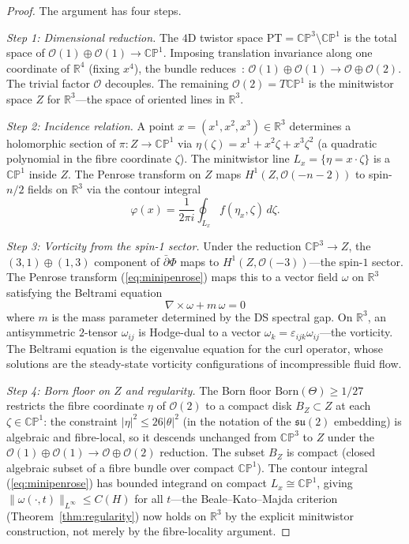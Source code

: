 \documentclass[11pt,a4paper]{article}
\theoremstyle{definition}
\theoremstyle{remark}
\newcommand{\CP}{\mathbb{CP}}
\newcommand{\R}{\mathbb{R}}
\newcommand{\dbar}{\bar{\partial}}
\newcommand{\su}{\mathfrak{su}}
\newcommand{\PT}{\mathrm{PT}}
\begin{document}
\begin{proof}
The argument has four steps.

\emph{Step 1: Dimensional reduction.} The $4$D twistor space $\PT=\CP^3\setminus\CP^1$ is the total space of $\mathcal{O}(1)\oplus\mathcal{O}(1)\to\CP^1$. Imposing translation invariance along one coordinate of $\R^4$ (fixing $x^4$), the bundle reduces~\cite{Hitchin1982}: $\mathcal{O}(1)\oplus\mathcal{O}(1)\to\mathcal{O}\oplus\mathcal{O}(2)$. The trivial factor $\mathcal{O}$ decouples. The remaining $\mathcal{O}(2)=T\CP^1$ is the minitwistor space $Z$ for $\R^3$---the space of oriented lines in $\R^3$.

\emph{Step 2: Incidence relation.} A point $x=(x^1,x^2,x^3)\in\R^3$ determines a holomorphic section of $\pi:Z\to\CP^1$ via $\eta(\zeta)=x^1+x^2\zeta+x^3\zeta^2$ (a quadratic polynomial in the fibre coordinate $\zeta$). The minitwistor line $L_x=\{\eta=x\cdot\zeta\}$ is a $\CP^1$ inside $Z$. The Penrose transform on $Z$ maps $H^1(Z,\mathcal{O}(-n-2))$ to spin-$n/2$ fields on $\R^3$ via the contour integral
\begin{equation}\label{eq:minipenrose}
\varphi(x)=\frac{1}{2\pi i}\oint_{L_x}f(\eta_x,\zeta)\,d\zeta.
\end{equation}

\emph{Step 3: Vorticity from the spin-1 sector.} Under the reduction $\CP^3\to Z$, the $(3,1)\oplus(1,3)$ component of $\dbar\Phi$ maps to $H^1(Z,\mathcal{O}(-3))$---the spin-$1$ sector. The Penrose transform (\ref{eq:minipenrose}) maps this to a vector field $\omega$ on $\R^3$ satisfying the Beltrami equation
\begin{equation}\label{eq:beltrami}
\nabla\times\omega+m\,\omega=0
\end{equation}
where $m$ is the mass parameter determined by the DS spectral gap. On $\R^3$, an antisymmetric $2$-tensor $\omega_{ij}$ is Hodge-dual to a vector $\omega_k=\varepsilon_{ijk}\omega_{ij}$---the vorticity. The Beltrami equation is the eigenvalue equation for the curl operator, whose solutions are the steady-state vorticity configurations of incompressible fluid flow.

\emph{Step 4: Born floor on $Z$ and regularity.} The Born floor $\mathrm{Born}(\Theta)\geq 1/27$ restricts the fibre coordinate $\eta$ of $\mathcal{O}(2)$ to a compact disk $B_Z\subset Z$ at each $\zeta\in\CP^1$: the constraint $|\eta|^2\leq 26|\theta|^2$ (in the notation of the $\su(2)$ embedding) is algebraic and fibre-local, so it descends unchanged from $\CP^3$ to $Z$ under the $\mathcal{O}(1)\oplus\mathcal{O}(1)\to\mathcal{O}\oplus\mathcal{O}(2)$ reduction. The subset $B_Z$ is compact (closed algebraic subset of a fibre bundle over compact $\CP^1$). The contour integral (\ref{eq:minipenrose}) has bounded integrand on compact $L_x\cong\CP^1$, giving $\|\omega(\cdot,t)\|_{L^\infty}\leq C(H)$ for all $t$---the Beale--Kato--Majda criterion (Theorem~\ref{thm:regularity}) now holds on $\R^3$ by the explicit minitwistor construction, not merely by the fibre-locality argument.
\end{proof}
\end{document}
